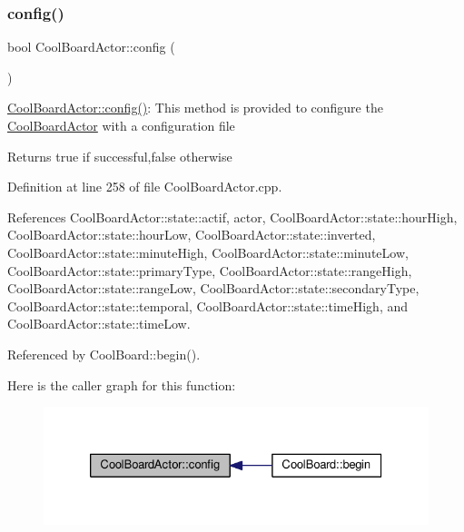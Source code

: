 \subsubsection{\texorpdfstring{config()}{config()}}
{\footnotesize\ttfamily bool Cool\+Board\+Actor\+::config (\begin{DoxyParamCaption}{ }\end{DoxyParamCaption})}

\hyperlink{class_cool_board_actor_a5af5538fc7d169f63127e06d5219bcd4}{Cool\+Board\+Actor\+::config()}\+: This method is provided to configure the \hyperlink{class_cool_board_actor}{Cool\+Board\+Actor} with a configuration file

\begin{DoxyReturn}{Returns}
true if successful,false otherwise 
\end{DoxyReturn}


Definition at line 258 of file Cool\+Board\+Actor.\+cpp.



References Cool\+Board\+Actor\+::state\+::actif, actor, Cool\+Board\+Actor\+::state\+::hour\+High, Cool\+Board\+Actor\+::state\+::hour\+Low, Cool\+Board\+Actor\+::state\+::inverted, Cool\+Board\+Actor\+::state\+::minute\+High, Cool\+Board\+Actor\+::state\+::minute\+Low, Cool\+Board\+Actor\+::state\+::primary\+Type, Cool\+Board\+Actor\+::state\+::range\+High, Cool\+Board\+Actor\+::state\+::range\+Low, Cool\+Board\+Actor\+::state\+::secondary\+Type, Cool\+Board\+Actor\+::state\+::temporal, Cool\+Board\+Actor\+::state\+::time\+High, and Cool\+Board\+Actor\+::state\+::time\+Low.



Referenced by Cool\+Board\+::begin().

Here is the caller graph for this function\+:
\nopagebreak
\begin{figure}[H]
\begin{center}
\leavevmode
\includegraphics[width=326pt]{dc/d69/class_cool_board_actor_a5af5538fc7d169f63127e06d5219bcd4_icgraph}
\end{center}
\end{figure}
\mbox{\label{class_cool_board_actor_aabb10e7aebc3249ffc940530de29f84a}} 
